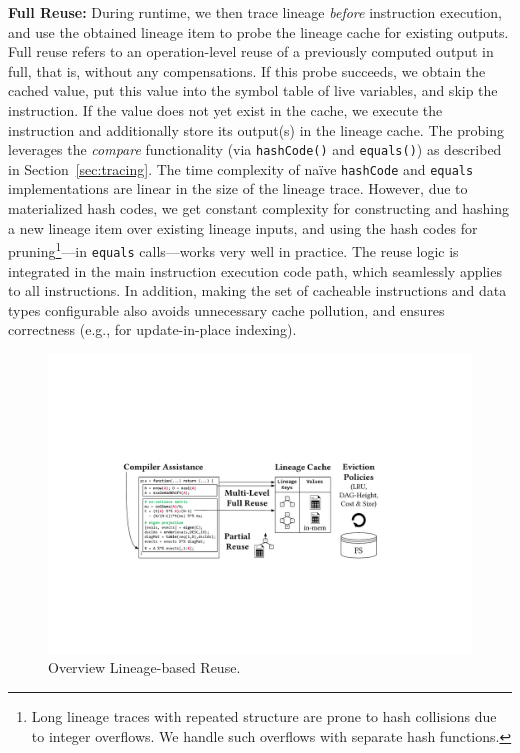\textbf{Full Reuse:} During runtime, we then trace lineage \emph{before} instruction execution, and use the obtained lineage item to probe the lineage cache for existing outputs. Full reuse refers to an operation-level reuse of a previously computed output in full, that is, without any compensations. If this probe succeeds, we obtain the cached value, put this value into the symbol table of live variables, and skip the instruction. If the value does not yet exist in the cache, we execute the instruction and additionally store its output(s) in the lineage cache. The probing leverages the \emph{compare} functionality (via \texttt{hashCode()} and \texttt{equals()}) as described in Section~\ref{sec:tracing}. The time complexity of na\"ive \texttt{hashCode} and \texttt{equals} implementations are linear in the size of the lineage trace. However, due to materialized hash codes, we get constant complexity for constructing and hashing a new lineage item over existing lineage inputs, and using the hash codes for pruning\footnote{Long lineage traces with repeated structure are prone to hash collisions due to integer overflows. We handle such overflows with separate hash functions.}---in \texttt{equals} calls---works very well in practice. The reuse logic is integrated in the main instruction execution code path, which seamlessly applies to all instructions. In addition, making the set of cacheable instructions and data types configurable also avoids unnecessary cache pollution, and ensures correctness (e.g., for update-in-place indexing). 

\begin{figure}[!t]
	\centering
	\includegraphics[scale=0.32]{figures/reuse}
	\vspace{-0.25cm}
	\caption{\label{fig:reuse}Overview Lineage-based Reuse.}
\end{figure}

